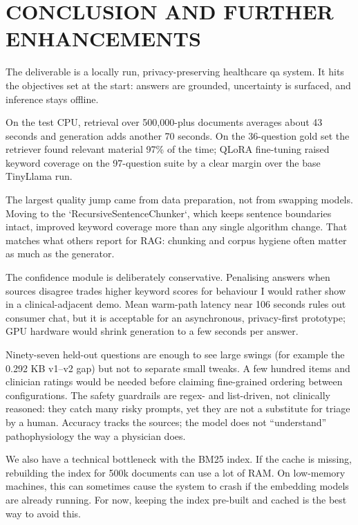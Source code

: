 \chapter{\MakeUppercase{Conclusion and Further Enhancements}}

The deliverable is a locally run, privacy-preserving healthcare \ac{qa} system. It hits the objectives set at the start: answers are grounded, uncertainty is surfaced, and inference stays offline.

On the test CPU, retrieval over 500{,}000-plus documents averages about 43 seconds and generation adds another 70 seconds. On the 36-question gold set the retriever found relevant material 97\% of the time; QLoRA fine-tuning raised keyword coverage on the 97-question suite by a clear margin over the base TinyLlama run.

The largest quality jump came from data preparation, not from swapping models. Moving to the `RecursiveSentenceChunker`, which keeps sentence boundaries intact, improved keyword coverage more than any single algorithm change. That matches what others report for RAG: chunking and corpus hygiene often matter as much as the generator.

The confidence module is deliberately conservative. Penalising answers when sources disagree trades higher keyword scores for behaviour I would rather show in a clinical-adjacent demo. Mean warm-path latency near 106 seconds rules out consumer chat, but it is acceptable for an asynchronous, privacy-first prototype; GPU hardware would shrink generation to a few seconds per answer.

Ninety-seven held-out questions are enough to see large swings (for example the 0.292 KB v1--v2 gap) but not to separate small tweaks. A few hundred items and clinician ratings would be needed before claiming fine-grained ordering between configurations. The safety guardrails are regex- and list-driven, not clinically reasoned: they catch many risky prompts, yet they are not a substitute for triage by a human. Accuracy tracks the sources; the model does not ``understand'' pathophysiology the way a physician does.

We also have a technical bottleneck with the BM25 index. If the cache is missing, rebuilding the index for 500k documents can use a lot of RAM. On low-memory machines, this can sometimes cause the system to crash if the embedding models are already running. For now, keeping the index pre-built and cached is the best way to avoid this.

